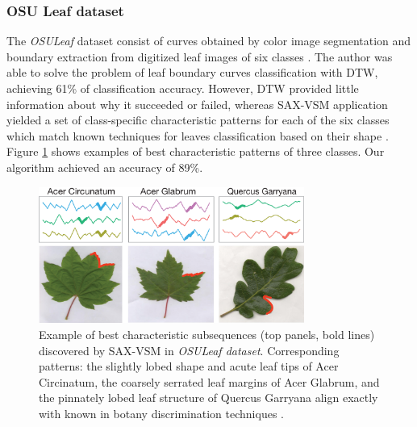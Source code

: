 \documentclass[conference]{IEEEtran}
\begin{document}
\subsubsection{OSU Leaf dataset}
The \textit{OSULeaf} dataset consist of curves obtained by color image segmentation 
and boundary extraction from digitized leaf images of six classes \cite{osuleaf}.
The author was able to solve the problem of leaf boundary curves classification 
with DTW, achieving 61\% of classification accuracy. 
However, DTW provided little information about why it succeeded or failed,
whereas SAX-VSM application yielded a set of class-specific characteristic 
patterns for each of the six classes which match known techniques for leaves 
classification based on their shape \cite{dirr}. Figure \ref{fig:shapelet-acer-patterns}
shows examples of best characteristic patterns of three classes. Our algorithm 
achieved an accuracy of 89\%.

\begin{figure}[t]
   \centering
   \vspace{-0.2cm}
   \includegraphics[width=87mm]{figures/AcerCircunatum-short.eps}
  \caption{Example of best characteristic subsequences (top panels, bold lines) discovered 
   by SAX-VSM in \textit{OSULeaf dataset}.
   Corresponding patterns: the slightly lobed shape and acute leaf tips of Acer Circinatum, 
   the coarsely serrated leaf margins of Acer Glabrum, 
   and the pinnately lobed leaf structure of Quercus Garryana
   align exactly with known in botany discrimination techniques \cite{dirr}.}
   \label{fig:shapelet-acer-patterns}
   \vspace{-0.2cm}
\end{figure}
\end{document}
